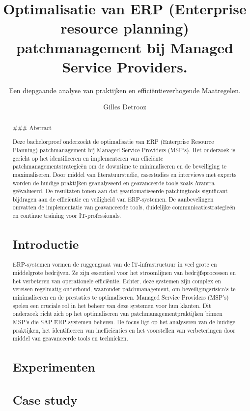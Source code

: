 \documentclass[a0,portrait]{hogent-poster}
\title{Optimalisatie van ERP (Enterprise resource planning) patchmanagement bij Managed Service Providers.}
\subtitle{Een diepgaande analyse van praktijken en efficiëntieverhogende Maatregelen.}
\author{Gilles Detrooz}
\begin{document}
\maketitle

\begin{abstract}
  ### Abstract

  Deze bachelorproef onderzoekt de optimalisatie van ERP (Enterprise Resource Planning) patchmanagement bij Managed Service Providers (MSP's). Het onderzoek is gericht op het identificeren en implementeren van efficiënte patchmanagementstrategieën om de downtime te minimaliseren en de beveiliging te maximaliseren. Door middel van literatuurstudie, casestudies en interviews met experts worden de huidige praktijken geanalyseerd en geavanceerde tools zoals Avantra geëvalueerd. De resultaten tonen aan dat geautomatiseerde patchingtools significant bijdragen aan de efficiëntie en veiligheid van ERP-systemen. De aanbevelingen omvatten de implementatie van geavanceerde tools, duidelijke communicatiestrategieën en continue training voor IT-professionals.

\begin{multicols}{2} %

\section{Introductie}
ERP-systemen vormen de ruggengraat van de IT-infrastructuur in veel grote en middelgrote bedrijven. Ze zijn essentieel voor het stroomlijnen van bedrijfsprocessen en het verbeteren van operationele efficiëntie. Echter, deze systemen zijn complex en vereisen regelmatig onderhoud, waaronder patchmanagement, om beveiligingsrisico's te minimaliseren en de prestaties te optimaliseren. Managed Service Providers (MSP's) spelen een cruciale rol in het beheer van deze systemen voor hun klanten. Dit onderzoek richt zich op het optimaliseren van patchmanagementpraktijken binnen MSP's die SAP ERP-systemen beheren. De focus ligt op het analyseren van de huidige praktijken, het identificeren van inefficiënties en het voorstellen van verbeteringen door middel van geavanceerde tools en technieken.

\section{Experimenten}


\section{Case study}


\end{multicols}
\end{abstract}
\end{document}
